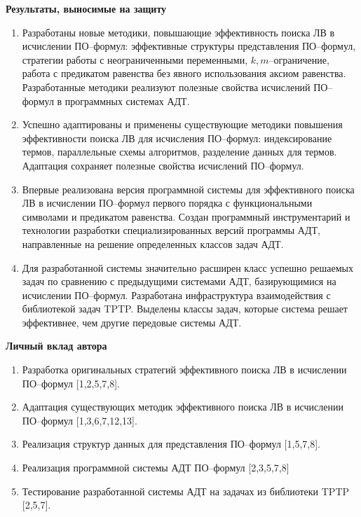 \documentclass[a4paper]{report}
\begin{document}
\textbf{Результаты, выносимые на защиту}
\begin{enumerate}

\item Разработаны новые методики, повышающие эффективность поиска ЛВ в исчислении ПО--формул: эффективные структуры представления ПО--формул, стратегии работы с неограниченными переменными, $k,m$--ограничение, работа с предикатом равенства без явного использования аксиом равенства. Разработанные методики реализуют полезные свойства исчислений ПО--формул в программных системах АДТ.

\item Успешно адаптированы и применены существующие методики повышения эффективности поиска ЛВ для исчисления ПО--формул: индексирование термов, параллельные схемы алгоритмов, разделение данных для термов. Адаптация сохраняет полезные свойства исчислений ПО--формул.

\item Впервые реализована версия программной системы для эффективного поиска ЛВ в исчислении ПО--формул первого порядка с функциональными символами и предикатом равенства. Создан программный инструментарий и технологии разработки специализированных версий программы АДТ, направленные на решение определенных классов задач АДТ.

\item Для разработанной системы значительно расширен класс успешно решаемых задач по сравнению с предыдущими системами АДТ, базирующимися на исчислении ПО--формул. Разработана инфраструктура взаимодействия с библиотекой задач TPTP. Выделены классы задач, которые система решает эффективнее, чем другие передовые системы АДТ.
\end{enumerate}


\textbf{Личный вклад автора}
\begin{enumerate}
\item Разработка оригинальных стратегий эффективного поиска ЛВ в исчислении ПО--формул [1,2,5,7,8].
\item Адаптация существующих методик эффективного поиска ЛВ в исчислении ПО--формул [1,3,6,7,12,13].
\item Реализация структур данных для представления ПО--формул [1,5,7,8].
\item Реализация программной системы АДТ ПО--формул [2,3,5,7,8]
\item Тестирование разработанной системы АДТ на задачах из библиотеки TPTP [2,5,7].
\end{enumerate}
\end{document}
